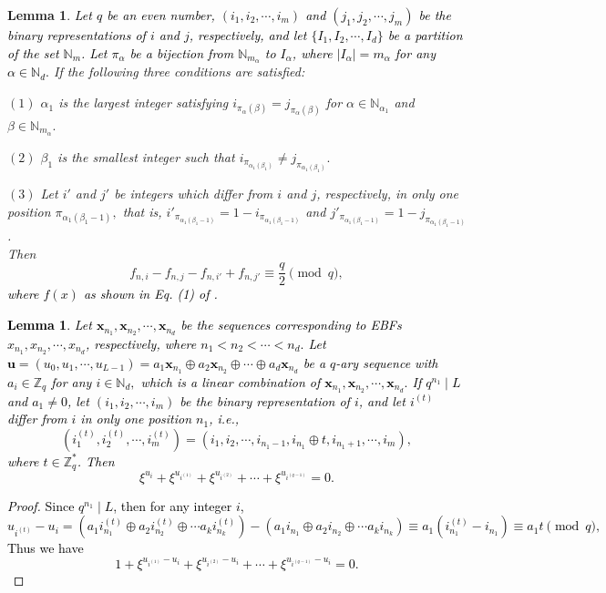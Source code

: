 \documentclass[11pt]{article}
\newcommand{\2} {$2$-to-$1$}
\newtheorem{lem}[thm]{\bfseries   Lemma}
\begin{document}
\begin{lem}\label{lem1}\cite{CY}
	\textcolor{black}{Let $q$ be an even number, $(i_1,i_2,\cdots,i_m)$  and $(j_1,j_2,\cdots,j_m)$  be the binary representations of $i$ and $j$, respectively, and let $\{I_1, I_2,\cdots,I_d\}$ be a partition of the set $\mathbb{N}_m$. Let $ \pi_{\alpha} $ be a bijection from $\mathbb{N}_{m_{\alpha}}$ to $ I_{\alpha} $, where $ \lvert I_{\alpha}\rvert =m_{\alpha} $ for any $ \alpha\in \mathbb{N}_d. $} If the following three  conditions are satisfied:
	
	$ (1) $ $ \alpha_{1} $ is the largest integer satisfying
	$ i_{\pi_{\alpha}(\beta)}= j_{\pi_{\alpha}(\beta)} $ for
	$ \alpha\in \mathbb{N}_{\alpha_1}$ and $ \beta\in \mathbb{N}_{m_{\alpha}}. $
	
	$ (2) $ $ \beta_1 $ is the smallest integer such that $ i_{\pi_{\alpha_{1}(\beta_{1})}}\neq j_{\pi_{\alpha_{1}(\beta_{1})}}. $
	
	$ (3) $    Let $ i' $ and $ j' $ be integers which differ from $ i $ and $ j $, respectively, in only one position $ \pi_{\alpha_{1}(\beta_{1}-1)}, $ that is, $ i'_{\pi_{\alpha_{1}(\beta_{1}-1)}}=1-i_{\pi_{\alpha_{1}(\beta_{1}-1)}} $ and $ j'_{\pi_{\alpha_{1}(\beta_{1}-1)}}=1-j_{\pi_{\alpha_{1}(\beta_{1}-1)}} $.\\
	Then $$ f_{n,i}-f_{n,j}-f_{n,i'}+f_{n,j'}\equiv \frac{q}{2}\pmod q,$$
	\textcolor{black}{where $f(x)$ as shown in Eq. (1) of \cite{CY}.}
\end{lem}
\textcolor{black}{\begin{lem}\label{lem3}
		Let $ \textbf{x}_{n_1}, \textbf{x}_{n_2},\cdots,\textbf{x}_{n_d}$ be the sequences corresponding to EBFs $ x_{n_1}, x_{n_2},\cdots,x_{n_d}$, respectively, where $ n_1<n_2<\cdots<n_d. $ Let   $ \textbf{u}=(u_0,u_1,\cdots,u_{L-1})=a_1\textbf{x}_{n_1}\oplus a_2\textbf{x}_{n_2}\oplus \cdots \oplus a_d\textbf{x}_{n_d} $ be a $q$-ary sequence with $ a_i\in \mathbb{Z}_q $ for any $ i\in \mathbb{N}_d, $ which is a   linear combination of $ \textbf{x}_{n_1}, \textbf{x}_{n_2},\cdots,\textbf{x}_{n_d}.$  If $ q^{n_1}\mid L $ and $a_1\neq 0$, let $(i_1,i_2,\cdots,i_m)$ be the binary representation of $i$, and let   $i^{(t)} $ differ from $i$ in only one position $n_1$, i.e.,   $$(i^{(t)}_1,i^{(t)}_2,\cdots,i^{(t)}_{m})=(i_1,i_2,\cdots,i_{n_1-1},i_{n_1}\oplus t,i_{n_1+1},\cdots,i_{m}),$$ where $t\in \mathbb{Z}^*_{q}$. Then $$\xi^{u_i}+\xi^{u_{i^{(1)}}}+\xi^{u_{i^{(2)}}}+\cdots+\xi^{u_{i^{(q-1)}}}=0.$$
	\end{lem}
\begin{proof}
	Since $ q^{n_1}\mid L $, then for any integer $i$,  $$u_{i^{(t)}}-u_i=(a_1i^{(t)}_{n_1}\oplus a_2i^{(t)}_{n_2}\oplus\cdots a_ki^{(t)}_{n_k} )-(a_1i_{n_1}\oplus a_2i_{n_2}\oplus\cdots a_ki_{n_k} )\equiv a_1(i^{(t)}_{n_1}-i_{n_1})\equiv a_1t\pmod q,$$
Thus we have $$1+\xi^{u_{i^{(1)}}-u_i}+\xi^{u_{i^{(2)}}-u_i}+\cdots+\xi^{u_{i^{(q-1)}}-u_i}=0.$$
\end{proof}}
\end{document}
